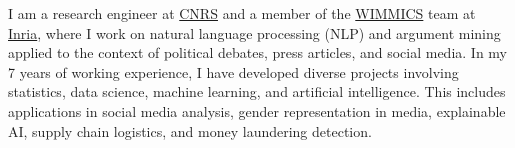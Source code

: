 \documentclass[10pt,a4paper,ragged2e,withhyper]{altacv}
\begin{document}

\makecvheader

\begin{justify}
\vspace{-1em}
I am a research engineer at \href{https://www.cnrs.fr/en}{CNRS} and a member of the \href{https://team.inria.fr/wimmics/}{WIMMICS} team at \href{https://inria.fr/en}{Inria}, where I work on natural language processing (NLP) and argument mining applied to the context of political debates, press articles, and social media.
In my 7 years of working experience, I have developed diverse projects involving statistics, data science, machine learning, and artificial intelligence.
This includes applications in social media analysis, gender representation in media, explainable AI, supply chain logistics, and money laundering detection.
\end{justify}
\end{document}
